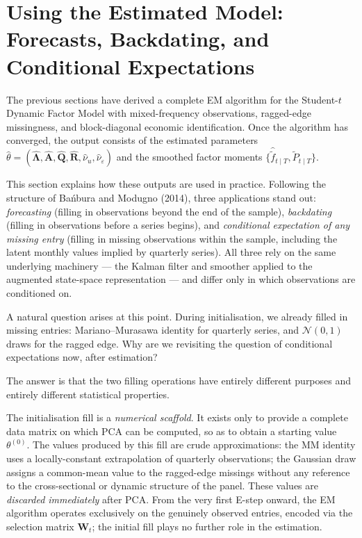 \documentclass[11pt, a4paper, oneside]{article}
\newcommand{\mL}{\boldsymbol{\Lambda}}
\newcommand{\mA}{\mathbf{A}}
\newcommand{\mR}{\mathbf{R}}
\newcommand{\mQ}{\mathbf{Q}}
\begin{document}
\newpage

\section{Using the Estimated Model: Forecasts, Backdating, and Conditional Expectations}
\label{sec:using-the-model}

The previous sections have derived a complete EM algorithm for the
Student-$t$ Dynamic Factor Model with mixed-frequency observations,
ragged-edge missingness, and block-diagonal economic identification.
Once the algorithm has converged, the output consists of the estimated
parameters $\hat{\theta} = (\hat{\mL}, \hat{\mA}, \hat{\mQ}, \hat{\mR}, \hat{\nu}_u, \hat{\nu}_\varepsilon)$
and the smoothed factor moments $\{\hat{\tilde{f}}_{t \mid T}, \tilde{P}_{t \mid T}\}$.

This section explains how these outputs are used in practice. Following
the structure of Ba\'nbura and Modugno (2014), three
applications stand out: \emph{forecasting} (filling in observations
beyond the end of the sample), \emph{backdating} (filling in
observations before a series begins), and \emph{conditional expectation
of any missing entry} (filling in missing observations within the
sample, including the latent monthly values implied by quarterly
series). All three rely on the same underlying machinery — the Kalman
filter and smoother applied to the augmented state-space representation
— and differ only in which observations are conditioned on.


A natural question arises at this point. During initialisation, we already filled in missing
entries: Mariano--Murasawa identity for quarterly series, and
$\mathcal{N}(0, 1)$ draws for the ragged edge. Why are we revisiting
the question of conditional expectations now, after estimation?

The answer is that the two filling operations have entirely different
purposes and entirely different statistical properties.

The initialisation fill is a \emph{numerical scaffold}. It exists only
to provide a complete data matrix on which PCA can be computed, so as
to obtain a starting value $\theta^{(0)}$. The values produced by this
fill are crude approximations: the MM identity uses a locally-constant
extrapolation of quarterly observations; the Gaussian draw assigns a
common-mean value to the ragged-edge missings without any reference
to the cross-sectional or dynamic structure of the panel. These values
are \emph{discarded immediately} after PCA. From the very first
E-step onward, the EM algorithm operates exclusively on the genuinely
observed entries, encoded via the selection matrix $\mathbf{W}_t$;
the initial fill plays no further role in the estimation.
\end{document}
